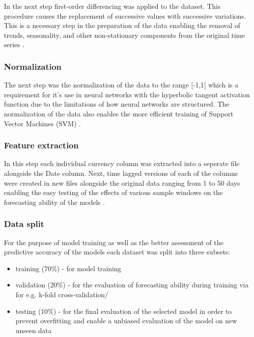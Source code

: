 In the next step first-order differencing was applied to the dataset. This procedure causes the replacement of successive values with successive variations. This is a necessary step in the preparation of the data enabling the removal of trends, seasonality, and other non-stationary components from the original time series \cite{nn-vs-chaotic,robust-regression,gbp-usd-forecasting}.

\subsubsection{Normalization}\label{Normalization}

The next step was the normalization of the data to the range [-1,1] which is a requirement for it's use in neural networks with the hyperbolic tangent activation function due to the limitations of how neural networks are structured. The normalization of the data also enables the more efficient training of Support Vector Machines (SVM) \cite{nn-vs-chaotic,genetic,rf-svr,ann-2}.

\subsubsection{Feature extraction}\label{Feature extraction}

In this step each individual currency column was extracted into a seperate file alongside the Date column. Next, time lagged versions of each of the columns were created in new files alongside the original data ranging from 1 to 50 days enabling the easy testing of the effects of various sample windows on the forecasting ability of the models \cite{rf-svr,gold}.

\subsubsection{Data split}\label{Data split}

For the purpose of model training as well as the better assessment of the predictive accuracy of the models each dataset was split into three subsets:
\begin{itemize}
    \item training (70\%) - for model training
    \item validation (20\%) - for the evaluation of forecasting ability during training via for e.g. k-fold cross-validation/
    \item testing (10\%) - for the final evaluation of the selected model in order to prevent overfitting and enable a unbiased evaluation of the model on new unseen data
\end{itemize}

